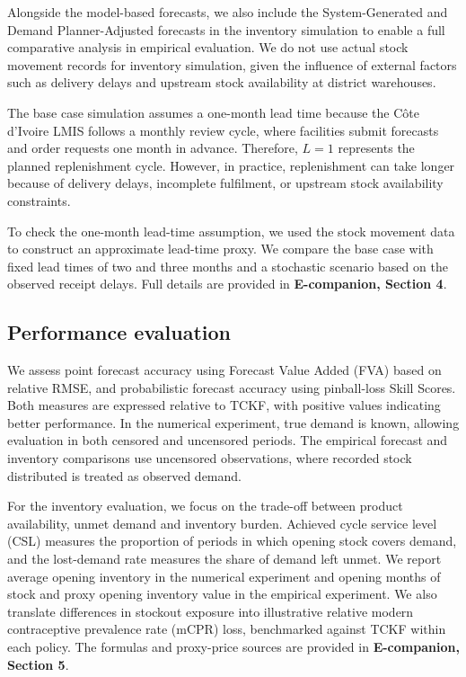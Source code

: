 \documentclass[
  11pt,
  authoryear,
  doubleblind,
  3p]{elsarticle}
\begin{document}
Alongside the model-based forecasts, we also include the
System-Generated and Demand Planner-Adjusted forecasts in the inventory
simulation to enable a full comparative analysis in empirical
evaluation. We do not use actual stock movement records for inventory
simulation, given the influence of external factors such as delivery
delays and upstream stock availability at district warehouses.

The base case simulation assumes a one-month lead time because the Côte
d'Ivoire LMIS follows a monthly review cycle, where facilities submit
forecasts and order requests one month in advance. Therefore, \(L=1\)
represents the planned replenishment cycle. However, in practice,
replenishment can take longer because of delivery delays, incomplete
fulfilment, or upstream stock availability constraints.

To check the one-month lead-time assumption, we used the stock movement
data to construct an approximate lead-time proxy. We compare the base
case with fixed lead times of two and three months and a stochastic
scenario based on the observed receipt delays. Full details are provided
in \textbf{E-companion, Section 4}.

\subsection{Performance evaluation}\label{performance-evaluation}

We assess point forecast accuracy using Forecast Value Added (FVA) based
on relative RMSE, and probabilistic forecast accuracy using pinball-loss
Skill Scores. Both measures are expressed relative to TCKF, with
positive values indicating better performance. In the numerical
experiment, true demand is known, allowing evaluation in both censored
and uncensored periods. The empirical forecast and inventory comparisons
use uncensored observations, where recorded stock distributed is treated
as observed demand.

For the inventory evaluation, we focus on the trade-off between product
availability, unmet demand and inventory burden. Achieved cycle service
level (CSL) measures the proportion of periods in which opening stock
covers demand, and the lost-demand rate measures the share of demand
left unmet. We report average opening inventory in the numerical
experiment and opening months of stock and proxy opening inventory value
in the empirical experiment. We also translate differences in stockout
exposure into illustrative relative modern contraceptive prevalence rate
(mCPR) loss, benchmarked against TCKF within each policy. The formulas
and proxy-price sources are provided in \textbf{E-companion, Section 5}.
\end{document}
